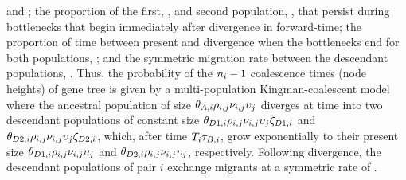 \begin{linenomath}
and ;
the proportion of the first, , and second population,
, that persist during bottlenecks that begin immediately
after divergence in forward-time;
the proportion of time between present and divergence when the bottlenecks
end for both populations, \bottleTime{};
and the symmetric migration rate between the descendant populations,
\migrationRate{}.
Thus, the probability of the $\popSampleSize{i}{}-1$ coalescence times (node
heights) of gene tree  is given by a multi-population
Kingman-coalescent model \cite{Kingman1982} where the ancestral population of
size
$\ancestralTheta{i}\ploidyScalar{i}{j}\mutationRateScalarConstant{i}{j}\locusMutationRateScalar{j}$
diverges at time  into two descendant populations of constant
size
$\descendantTheta{1}{i}\ploidyScalar{i}{j}\mutationRateScalarConstant{i}{j}\locusMutationRateScalar{j}\bottleScalar{1}{i}$
and
$\descendantTheta{2}{i}\ploidyScalar{i}{j}\mutationRateScalarConstant{i}{j}\locusMutationRateScalar{j}\bottleScalar{2}{i}$,
which, after time $\divTimeMap{i}\bottleTime{i}$, grow exponentially to their
present size 
$\descendantTheta{1}{i}\ploidyScalar{i}{j}\mutationRateScalarConstant{i}{j}\locusMutationRateScalar{j}$
and
$\descendantTheta{2}{i}\ploidyScalar{i}{j}\mutationRateScalarConstant{i}{j}\locusMutationRateScalar{j}$,
respectively.
Following divergence, the descendant populations of pair $i$ exchange migrants at a symmetric rate of
.
\end{linenomath}


